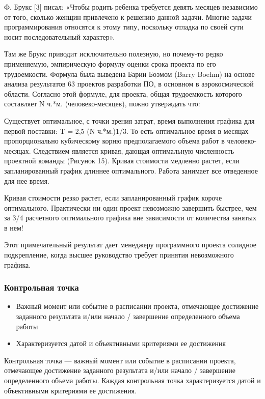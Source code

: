 \documentclass{../industrial-development}
\begin{document}
Ф. Брукс [3] писал: «Чтобы родить ребенка требуется девять месяцев независимо от того, сколько женщин привлечено к решению данной задачи. Многие задачи программирования относятся к этому типу, поскольку отладка по своей сути носит последовательный характер».

Там же Брукс приводит исключительно полезную, но почему-то редко применяемую, эмпирическую формулу оценки срока проекта по его трудоемкости. Формула была выведена Барии Боэмом (Barry Boehm) на основе анализа результатов 63 проектов разработки ПО, в основном в аэрокосмической области. Согласно этой формуле, для проекта, общая трудоемкость которого составляет N ч.*м. (человеко-месяцев), пожно утверждать что:

Существует оптимальное, с точки зрения затрат, время выполнения графика для первой поставки: T = 2,5 (N ч.*м.)1/3. То есть оптимальное время в месяцах пропорционально кубическому корню предполагаемого объема работ в человеко-месяцах. Следствием является кривая, дающая оптимальную численность проектной команды (Рисунок 15).
Кривая стоимости медленно растет, если запланированный график длиннее оптимального. Работа занимает все отведенное для нее время.

Кривая стоимости резко растет, если запланированный график короче оптимального. Практически ни один проект невозможно завершить быстрее, чем за 3/4 расчетного оптимального графика вне зависимости от количества занятых в нем!

Этот примечательный результат дает менеджеру программного проекта солидное подкрепление, когда высшее руководство требует принятия невозможного графика.

    \begin{frame} \frametitle{Контрольная точка}
	\begin{itemize}
		\item Важный момент или событие в расписании проекта, отмечающее достижение заданного результата и/или начало / завершение определенного объема работы
		\item Характеризуется датой и объективными критериями ее достижения
	\end{itemize}
    \end{frame}
    \lecturenotes

Контрольная точка — важный момент или событие в расписании проекта, отмечающее достижение заданного результата и/или начало / завершение определенного объема работы. Каждая контрольная точка характеризуется датой и объективными критериями ее достижения.
\end{document}
